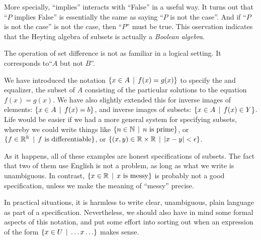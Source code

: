 More specially, ``implies'' interacts with ``False'' in a useful way.
It turns out that ``$P$ implies False'' is essentially the same as saying ``$P$ is not the case''. And if ``$P$ is not the case'' is not the case, then ``$P$'' must be true. This oservation indicates that the Heyting algebra of subsets is actually a \emph{Boolean algebra}.

The operation of set difference is not as familiar in a logical setting. It corresponds to``$A$ but not $B$''. 
 
We have introduced the notation $\{x\in A\,\mid\, f(x)=g(x)\}$ to specify the and equalizer, the subset of $A$ consisting of the particular solutions to the equation $f(x)=g(x)$. 
We have also slightly extended this for inverse images of elements: $\{x\in A \,\mid\, f(x)=b\}$, and inverse images of subsets: $\{x\in A\,\mid\, f(x)\in Y\}$. 
Life would be easier if we had a more general system for specifying subsets, whereby we could write things like $\{n\in \mathbb N \,\mid\, \text{$n$ is prime}\}$, or $\{f\in \mathbb R^\mathbb R\,\mid\, \text{$f$ is differentiable}\}$, or $\{(x,y)\in \mathbb R\times \mathbb R\,\mid\, |x-y| < \epsilon\}$. 

As it happens, all of these examples are honest specifications of subsets. 
The fact that two of them use English is not a problem, as long as what we write is unambiguous. 
In contrast, $\{x\in \mathbb R\,\mid\, \text{$x$ is messy}\}$ is probably not a good specification, unless we make the meaning of ``messy'' precise.

In practical situations, it is harmless to write clear, unambiguous, plain language as part of a specification. 
Nevertheless, we should also have in mind some formal aspects of this notation, and put some effort into sorting out when an expression of the form
$\{x\in U\,\mid\, \ldots x \ldots\}$ makes sense.

%
%

